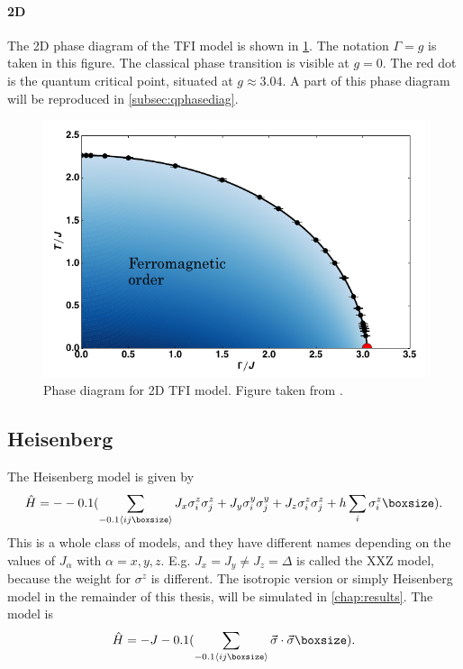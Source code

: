 \paragraph{2D}

The 2D phase diagram of the \Gls{TFI} model is shown in \cref{2dtisingphasediag}. The notation $\Gamma=g$ is taken in this figure. The classical phase transition is visible at $g=0$. The red dot is the quantum critical point, situated at $ g \approx 3.04  $. A part of this phase diagram will be reproduced in \cref{subsec:qphasediag}.

\begin{figure}[!htbp]
  \center
  \includegraphics[width=\textwidth]{Figuren/phsyics/2disingphase.png}
  \caption{Phase diagram for 2D \Gls{TFI} model. Figure taken from \cite{Hesselmann2016}.}
  \label{2dtisingphasediag}
\end{figure}

\subsection{Heisenberg}

The Heisenberg model is given by
\begin{equation}
  \hat{H} =  -\left( \sum_{\Braket{i j }} J_x \sigma^z_i \sigma^z_j + J_y \sigma^y_i \sigma^y_j+ J_z \sigma^z_i \sigma^z_j + h \sum_i \sigma^z_i \right ).
\end{equation}
This is a whole class of models, and they have different names depending on the values of $J_{\alpha} $ with $\alpha=x,y,z$. E.g. $J_x = J_y \neq J_z = \Delta$ is called the XXZ model, because the weight for $\sigma^z$ is different. The isotropic version or simply Heisenberg model in the remainder of this thesis, will be simulated in \cref{chap:results}. The model is
\begin{equation}
  \hat{H} =  -J \left( \sum_{\Braket{i j }} \vec{\sigma} \cdot \vec{\sigma} \right ).
\end{equation}

